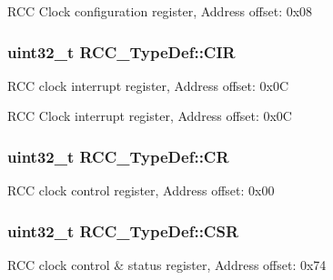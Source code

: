 R\-C\-C Clock configuration register, Address offset\-: 0x08 \hypertarget{struct_r_c_c___type_def_aeadf3a69dd5795db4638f71938704ff0}{
\subsubsection[{C\-I\-R}]{ uint32\-\_\-t R\-C\-C\-\_\-\-Type\-Def\-::\-C\-I\-R}}\label{struct_r_c_c___type_def_aeadf3a69dd5795db4638f71938704ff0}
R\-C\-C clock interrupt register, Address offset\-: 0x0\-C

R\-C\-C Clock interrupt register, Address offset\-: 0x0\-C \hypertarget{struct_r_c_c___type_def_abcb9ff48b9afb990283fefad0554b5b3}{
\subsubsection[{C\-R}]{ uint32\-\_\-t R\-C\-C\-\_\-\-Type\-Def\-::\-C\-R}}\label{struct_r_c_c___type_def_abcb9ff48b9afb990283fefad0554b5b3}
R\-C\-C clock control register, Address offset\-: 0x00 \hypertarget{struct_r_c_c___type_def_a7e913b8bf59d4351e1f3d19387bd05b9}{
\subsubsection[{C\-S\-R}]{ uint32\-\_\-t R\-C\-C\-\_\-\-Type\-Def\-::\-C\-S\-R}}\label{struct_r_c_c___type_def_a7e913b8bf59d4351e1f3d19387bd05b9}
R\-C\-C clock control \& status register, Address offset\-: 0x74

